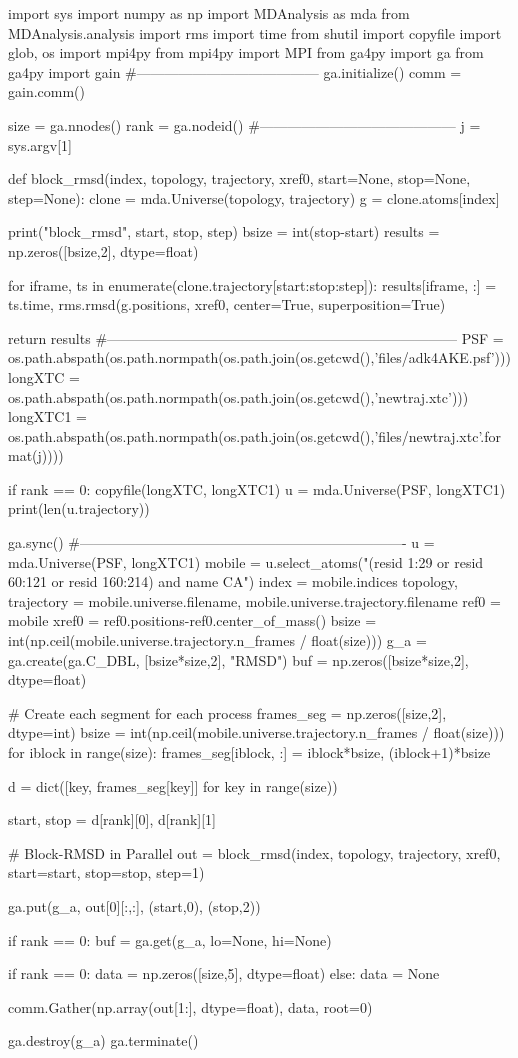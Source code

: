 \begin{python}
import sys
import numpy as np
import MDAnalysis as mda
from MDAnalysis.analysis import rms
import time
from shutil import copyfile
import glob, os
import mpi4py
from mpi4py import MPI
from ga4py import ga
from ga4py import gain
#---------------------------------------
ga.initialize()
comm = gain.comm()

size = ga.nnodes()
rank = ga.nodeid()
#------------------------------------------
j = sys.argv[1]

def block_rmsd(index, topology, trajectory, xref0, start=None, stop=None, step=None):
    clone = mda.Universe(topology, trajectory)
    g = clone.atoms[index]

    print("block_rmsd", start, stop, step)
    bsize = int(stop-start)
    results = np.zeros([bsize,2], dtype=float)

    for iframe, ts in enumerate(clone.trajectory[start:stop:step]):
        results[iframe, :] = ts.time, rms.rmsd(g.positions, xref0, center=True, superposition=True)

    return results
#---------------------------------------------------------------------------
PSF = os.path.abspath(os.path.normpath(os.path.join(os.getcwd(),'files/adk4AKE.psf')))
longXTC = os.path.abspath(os.path.normpath(os.path.join(os.getcwd(),'newtraj.xtc')))
longXTC1 = os.path.abspath(os.path.normpath(os.path.join(os.getcwd(),'files/newtraj{}.xtc'.format(j))))

if rank == 0:
   copyfile(longXTC, longXTC1)
   u = mda.Universe(PSF, longXTC1)
   print(len(u.trajectory))

ga.sync()
#----------------------------------------------------------------------
u = mda.Universe(PSF, longXTC1)
mobile = u.select_atoms("(resid 1:29 or resid 60:121 or resid 160:214) and name CA")
index = mobile.indices
topology, trajectory = mobile.universe.filename, mobile.universe.trajectory.filename
ref0 = mobile
xref0 = ref0.positions-ref0.center_of_mass()
bsize = int(np.ceil(mobile.universe.trajectory.n_frames / float(size)))
g_a = ga.create(ga.C_DBL, [bsize*size,2], "RMSD")
buf = np.zeros([bsize*size,2], dtype=float)

# Create each segment for each process
frames_seg = np.zeros([size,2], dtype=int)
bsize = int(np.ceil(mobile.universe.trajectory.n_frames / float(size)))
for iblock in range(size):
    frames_seg[iblock, :] = iblock*bsize, (iblock+1)*bsize

d = dict([key, frames_seg[key]] for key in range(size))

start, stop = d[rank][0], d[rank][1]

# Block-RMSD in Parallel
out = block_rmsd(index, topology, trajectory, xref0, start=start, stop=stop, step=1)

ga.put(g_a, out[0][:,:], (start,0), (stop,2))

if rank == 0:
   buf = ga.get(g_a, lo=None, hi=None)

if rank == 0:
   data = np.zeros([size,5], dtype=float)
else:
   data = None

comm.Gather(np.array(out[1:], dtype=float), data, root=0)
                 
ga.destroy(g_a)
ga.terminate()
\end{python}

